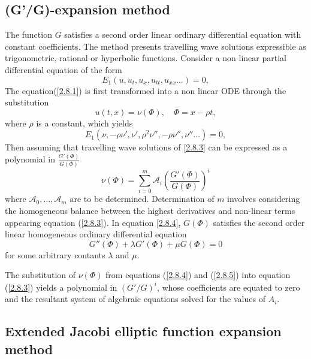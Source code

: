 \begin{defn}
\subsection{(G'/G)-expansion method }
\citep{wang2008g}
The function $G$ satisfies a second order linear ordinary differential equation with constant coefficients. The method presents travelling wave solutions expressible as trigonometric, rational or hyperbolic functions. Consider a non linear partial differential equation of the form
 \begin{equation}
E_{1}(u,u_{t}, u_{x}, u_{tt},u_{xx} \ldots) =0,  \label{2.8.1}
\end{equation} The equation(\ref{2.8.1}) is first transformed into a non linear ODE through the substitution
\begin{equation}
u(t,x) = \nu(\varPhi), \quad \varPhi = x- \rho t, \label{2.8.2}
\end{equation} where $\rho$ is a constant, which yields
\begin{equation} E_{1}(\nu,-\rho \nu', \nu',\rho^2\nu'', -\rho \nu'',\nu'' \ldots) =0,  \label{2.8.3}
\end{equation}
Then assuming that travelling wave solutions of \ref{2.8.3} can be expressed as a polynomial in $\frac{ G'(\varPhi)}{G(\varPhi)} $ \begin{equation} \nu(\varPhi) = \sum_{i=0}^{m} \mathcal{A}_i \left( \frac{ G'(\varPhi)}{G(\varPhi)}\right)^i  \label{2.8.4} 
\end{equation} where $ \mathcal{A}_0, \ldots, \mathcal{A}_m$ are to be determined. Determination of  $m$ involves considering the homogeneous balance between the highest derivatives and non-linear terms appearing equation (\ref{2.8.3}). In  equation \ref{2.8.4}, $ G(\varPhi)$ satisfies the second order  linear homogeneous ordinary differential equation \begin{equation} G''(\varPhi) + \lambda G'(\varPhi) + \mu G(\varPhi) =0 \label{2.8.5}
\end{equation} for some arbitrary contants $ \lambda$ and $\mu$.
\begin{rem}
The substitution of $\nu(\varPhi)$ from equations (\ref{2.8.4}) and (\ref{2.8.5}) into equation (\ref{2.8.3}) yields a polynomial in $(G'/G)^i$, whose coefficients are equated to zero and the resultant system of algebraic equations solved for the values of $A_i$.
\end{rem}
\subsection{Extended Jacobi elliptic function expansion method}


\end{defn}
